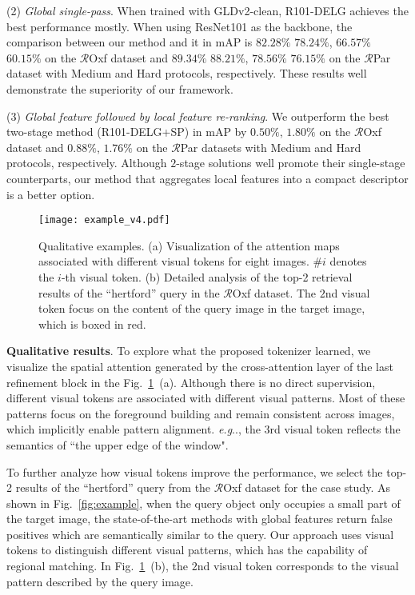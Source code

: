 \documentclass[letterpaper]{article} \usepackage{aaai22}  \usepackage{times}  \usepackage{helvet}  \usepackage{courier}  \usepackage[hyphens]{url}  \usepackage{graphicx} \urlstyle{rm} \def\UrlFont{\rm}  \usepackage{natbib}  \usepackage{caption} \DeclareCaptionStyle{ruled}{labelfont=normalfont,labelsep=colon,strut=off} \frenchspacing  \setlength{\pdfpagewidth}{8.5in}  \setlength{\pdfpageheight}{11in}  \usepackage{algorithm}
\makeatletter
\DeclareRobustCommand\onedot{\futurelet\@let@token\@onedot}
\def\@onedot{\ifx\@let@token.\else.\null\fi\xspace}
\def\eg{\emph{e.g}\onedot} \def\Eg{\emph{E.g}\onedot}
\makeatother
\begin{document}
\noindent(2) \textit{Global single-pass}. 
When trained with GLDv2-clean, R101-DELG achieves the best performance mostly.
When using ResNet101 as the backbone, the comparison between our method and it in mAP is 
$82.28\%$ \vs $78.24\%$, $66.57\%$ \vs $60.15\%$ on the $\mathcal{R}$Oxf dataset and
$89.34\%$ \vs $88.21\%$, $78.56\%$ \vs $76.15\%$ on the $\mathcal{R}$Par dataset with Medium and Hard protocols, respectively.
These results well demonstrate the superiority
of our framework.

\noindent(3) \textit{Global feature followed by local feature re-ranking}. 
We outperform the best two-stage method (R101-DELG+SP) in mAP by $0.50\%$, $1.80\%$ on the $\mathcal{R}$Oxf dataset and $0.88\%$, $1.76\%$ on the $\mathcal{R}$Par datasets with Medium and Hard protocols, respectively.
Although $2$-stage solutions well promote their single-stage counterparts, 
our method that aggregates local features into a compact descriptor is a better option.

\begin{figure}[t]
	\begin{center}
		\texttt{[image: example\_v4.pdf]}
	\end{center}
	\caption{Qualitative examples. 
		(a) Visualization of the attention maps associated with different visual tokens for eight images. $\#i$ denotes the $i$-th visual token.
		(b) Detailed analysis of the top-2 retrieval results of the ``hertford'' query in the $\mathcal{R}$Oxf dataset. The $2$nd visual token focus on the content of the query image in the target image, 
		which is boxed in red.
	}
	\label{fig:attn} 
\end{figure}

\noindent\textbf{Qualitative results}. 
To explore what the proposed tokenizer learned, we visualize the spatial attention generated by the cross-attention layer of the last refinement block in the Fig.~\ref{fig:attn}~(a).
Although there is no direct supervision, different visual tokens are associated with different visual patterns. 
Most of these patterns focus on the foreground building and remain consistent across images, which implicitly enable pattern alignment. 
\eg, the $3$rd visual token reflects the semantics of ``the upper edge of the window".

To further analyze how visual tokens improve the performance, we select the top-2 results of
the ``hertford'' query from the $\mathcal{R}$Oxf dataset for the case study. 
As shown in Fig.~\ref{fig:example}, when the query object only occupies a small part of the target image, the state-of-the-art methods with global features return false positives which are semantically similar to the query. 
Our approach uses visual tokens to distinguish different visual patterns, which has the capability of regional matching. In Fig.~\ref{fig:attn}~(b), the $2$nd visual token corresponds to the visual pattern described by the query image.
\end{document}
